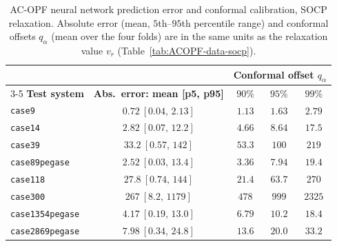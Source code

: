 \documentclass[10pt]{article} %
\theoremstyle{plain}
\theoremstyle{definition}
\theoremstyle{remark}
\begin{document}
\begin{table}[H]
\centering
\footnotesize
\caption{AC-OPF neural network prediction error and conformal calibration, SOCP relaxation. Absolute error (mean, $5$th--$95$th percentile range) and conformal offsets $q_\alpha$ (mean over the four folds) are in the same units as the relaxation value $v_r$ (Table~\ref{tab:ACOPF-data-socp}).}
\begin{tabular}{lc ccc}
\toprule
& & \multicolumn{3}{c}{\textbf{Conformal offset } $q_\alpha$} \\
\cmidrule(lr){3-5}
\textbf{Test system} & \textbf{Abs.\ error: mean [p5, p95]} & $90\%$ & $95\%$ & $99\%$ \\
\midrule
\texttt{case9}          & $0.72\ [0.04,\,2.13]$    & $1.13$  & $1.63$  & $2.79$  \\
\texttt{case14}         & $2.82\ [0.07,\,12.2]$    & $4.66$  & $8.64$  & $17.5$  \\
\texttt{case39}         & $33.2\ [0.57,\,142]$     & $53.3$  & $100$   & $219$   \\
\texttt{case89pegase}   & $2.52\ [0.03,\,13.4]$    & $3.36$  & $7.94$  & $19.4$  \\
\texttt{case118}        & $27.8\ [0.74,\,144]$     & $21.4$  & $63.7$  & $270$   \\
\texttt{case300}        & $267\ [8.2,\,1179]$      & $478$   & $999$   & $2325$  \\
\texttt{case1354pegase} & $4.17\ [0.19,\,13.0]$    & $6.79$  & $10.2$  & $18.4$  \\
\texttt{case2869pegase} & $7.98\ [0.34,\,24.8]$    & $13.6$  & $20.0$  & $33.2$  \\
\bottomrule
\end{tabular}
\label{tab:ACOPF-error-socp}
\end{table}
\end{document}
